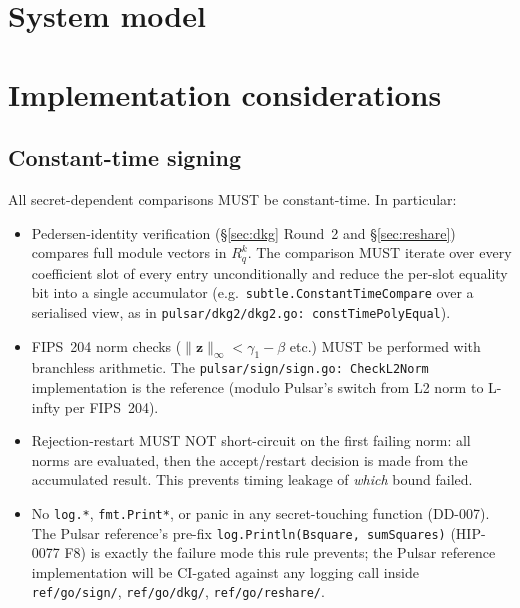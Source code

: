 \documentclass[11pt,a4paper]{article}
\theoremstyle{definition}
\theoremstyle{remark}
\newcommand{\Rq}{R_q}
\begin{document}
\section{System model}
\label{sec:system-model}



\section{Implementation considerations}
\label{sec:impl}

\subsection{Constant-time signing}
\label{sec:impl-ct}

All secret-dependent comparisons MUST be constant-time. In
particular:

\begin{itemize}[leftmargin=*, itemsep=0pt]
\item Pedersen-identity verification (\S\ref{sec:dkg} Round~2 and
\S\ref{sec:reshare}) compares full module vectors in $\Rq^k$. The
comparison MUST iterate over every coefficient slot of every entry
unconditionally and reduce the per-slot equality bit into a single
accumulator (e.g.\ \texttt{subtle.ConstantTimeCompare} over a
serialised view, as in
\texttt{pulsar/dkg2/dkg2.go: constTimePolyEqual}).
\item FIPS~204 norm checks ($\|\mathbf{z}\|_\infty < \gamma_1 - \beta$
etc.) MUST be performed with branchless arithmetic. The
\texttt{pulsar/sign/sign.go: CheckL2Norm} implementation is the
reference (modulo Pulsar's switch from L2 norm to L-infty per
FIPS~204).
\item Rejection-restart MUST NOT short-circuit on the first failing
norm: all norms are evaluated, then the accept/restart decision is
made from the accumulated result. This prevents timing leakage of
\emph{which} bound failed.
\item No \texttt{log.*}, \texttt{fmt.Print*}, or panic in any
secret-touching function (DD-007). The Pulsar reference's
pre-fix \texttt{log.Println(Bsquare, sumSquares)} (HIP-0077 F8) is
exactly the failure mode this rule prevents; the Pulsar reference
implementation will be CI-gated against any logging call inside
\texttt{ref/go/sign/}, \texttt{ref/go/dkg/}, \texttt{ref/go/reshare/}.
\end{itemize}
\end{document}
